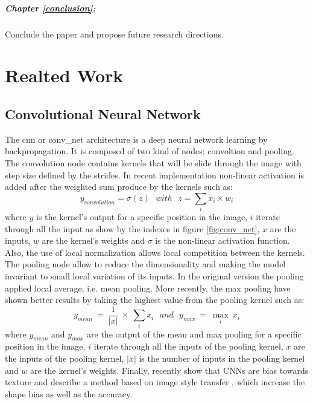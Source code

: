 \documentclass[11pt]{report}
\begin{document}
\paragraph{Chapter \ref{conclusion}:} Conclude the paper and propose future research directions.

\chapter{Realted Work} \label{related_work}

\section{Convolutional Neural Network}

The \acrshort{cnn} or \acrshort{conv_net} architecture \cite{NIPS1989_293} is a deep neural network learning by backpropagation. It is composed of two kind of nodes: convoltion and pooling. The convolution node contains kernels that will be slide through the image with step size defined by the strides. In recent implementation \cite{5537907} non-linear activation is added after the weighted sum produce by the kernels such as:
\begin{equation}
y_{convolution} = \sigma(z)\ \ \ with\ \ \ z = \sum_{i} x_i \times w_i
\end{equation}
where $y$ is the kernel's output for a specific position in the image, $i$ iterate through all the input as show by the indexes in figure \ref{fig:conv_net}, $x$ are the inputs, $w$ are the kernel's weights and $\sigma$ is the non-linear activation function. Also, the use of local normalization allows local competition between the kernels. The pooling node allow to reduce the dimensionality and making the model invariant to small local variation of its inputs. In the original version \textcite{NIPS1989_293} the pooling applied local average, i.e. mean pooling. More recently, the max pooling have shown better results \cite{10.1007/978-3-642-15825-4_10} by taking the highest value from the pooling kernel such as:
\begin{equation}
y_{mean}\ =\ \frac{1}{|x|}\ \times\ \sum_{i} x_i\ \ \ and\ \ \ y_{max}\ =\ \max_{i}\ x_i
\end{equation}
where $y_{mean}$ and $y_{max}$ are the output of the mean and max pooling for a specific position in the image, $i$ iterate through all the inputs of the pooling kernel, $x$ are the inputs of the pooling kernel, $|x|$ is the number of inputs in the pooling kernel and $w$ are the kernel's weights. Finally, \textcite{DBLP:journals/corr/abs-1811-12231} recently show that CNNs are bias towards texture and describe a method based on image style transfer \cite{Gatys_2016_CVPR}, which increase the shape bias as well as the accuracy.
\end{document}
